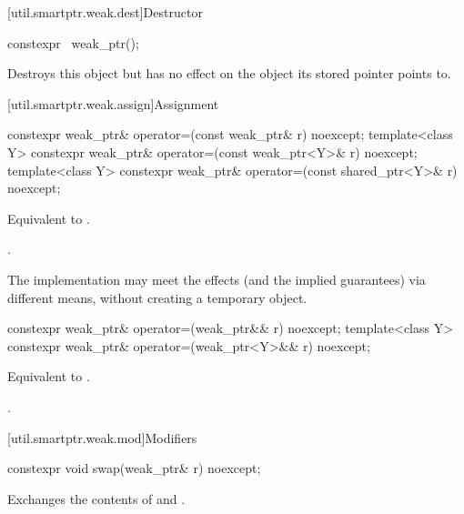 [util.smartptr.weak.dest]{Destructor}

%
\begin{itemdecl}
constexpr ~weak_ptr();
\end{itemdecl}

\begin{itemdescr}
\pnum
\effects
Destroys this  object but has no
effect on the object its stored pointer points to.
\end{itemdescr}

[util.smartptr.weak.assign]{Assignment}

%
\begin{itemdecl}
constexpr weak_ptr& operator=(const weak_ptr& r) noexcept;
template<class Y> constexpr weak_ptr& operator=(const weak_ptr<Y>& r) noexcept;
template<class Y> constexpr weak_ptr& operator=(const shared_ptr<Y>& r) noexcept;
\end{itemdecl}

\begin{itemdescr}
\pnum
\effects
Equivalent to .

\pnum
\returns
{}.

\pnum
\remarks
The implementation may meet the effects (and the
implied guarantees) via different means, without creating a temporary object.
\end{itemdescr}

%
\begin{itemdecl}
constexpr weak_ptr& operator=(weak_ptr&& r) noexcept;
template<class Y> constexpr weak_ptr& operator=(weak_ptr<Y>&& r) noexcept;
\end{itemdecl}

\begin{itemdescr}
\pnum
\effects
Equivalent to .

\pnum
\returns
{}.
\end{itemdescr}

[util.smartptr.weak.mod]{Modifiers}
%
\begin{itemdecl}
constexpr void swap(weak_ptr& r) noexcept;
\end{itemdecl}

\begin{itemdescr}
\pnum
\effects
Exchanges the contents of  and .
\end{itemdescr}

